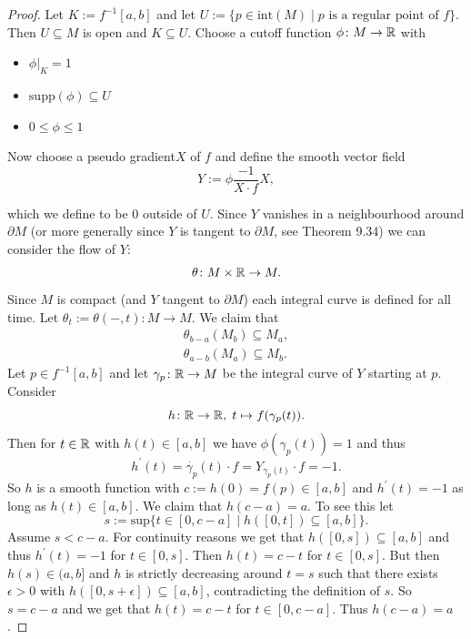     \begin{proof}
        Let $K := f^{-1}[a,b]$ and let $U := \{p \in \mathrm{int}(M) \mid p \text{ is a regular point of } f\}$. Then $U \subseteq M$ is open and $K \subseteq U$. Choose a cutoff function $\phi \colon M \to \mathbb{R}$ with
        \begin{itemize}
            \item $\phi|_{K} = 1$
            \item $\mathrm{supp}(\phi) \subseteq U$
            \item $0 \leq \phi \leq 1$
        \end{itemize}
        Now choose a pseudo gradient\footnotemark $X$ of $f$ and define the smooth vector field
        \[
            Y := \phi \frac{-1}{X \cdot f} X,
        \]



        \noindent which we define to be $0$ outside of $U$. Since $Y$ vanishes in a neighbourhood around $\partial M$ (or more generally since $Y$ is tangent to $\partial M$, see \cite{lee2011smooth} Theorem 9.34) we can consider the flow of $Y$: 
        \[
        \theta \colon M \times \mathbb{R} \to M.
        \]
        Since $M$ is compact (and $Y$ tangent to $\partial M$) each integral curve is defined for all time. Let $\theta_t := \theta( - ,t) \colon M \to M$. We claim that 
        \begin{align}
            \label{eq:flow1}
            \theta_{b-a}(M_b) \subseteq M_a, \\
            \label{eq:flow2}
            \theta_{a-b}(M_a) \subseteq M_b.
        \end{align}
        Let $p \in f^{-1}[a,b]$ and let $\gamma_p \colon \mathbb{R} \to M$ be the integral curve of $Y$ starting at $p$. Consider
        \[
        h \colon \mathbb{R} \to \mathbb{R}, \; t \mapsto f(\gamma_p(t)).
        \]
        Then for $t \in \mathbb{R}$ with $h(t) \in [a,b]$ we have $\phi(\gamma_p(t)) = 1$ and thus
        \[
        h^\prime(t) = \dot{\gamma_p}(t) \cdot f = Y_{\gamma_p(t)} \cdot f = -1.
        \]
        So $h$ is a smooth function with $c := h(0) = f(p) \in [a,b]$ and $h^\prime(t) = -1$ as long as $h(t) \in [a,b]$. We claim that $h(c-a) = a$. To see this let 
        \[
        s := \mathrm{sup}\{t \in [0,c-a] \mid h([0,t]) \subseteq [a,b]\}.
        \]
        Assume $s < c-a$. For continuity reasons we get that $h([0,s]) \subseteq [a,b]$ and thus $h^\prime(t) = -1$ for $t \in [0,s]$. Then $h(t) = c -t$ for $t \in [0,s]$. But then $h(s) \in (a,b]$ and $h$ is strictly decreasing around $t =s$ such that there exists $\epsilon >0$ with $h([0,s+\epsilon]) \subseteq [a,b]$, contradicting the definition of $s$. So $s = c-a$ and we get that $h(t) = c-t$ for $t \in [0,c-a]$. Thus $h(c-a) = a$.


\end{proof}
